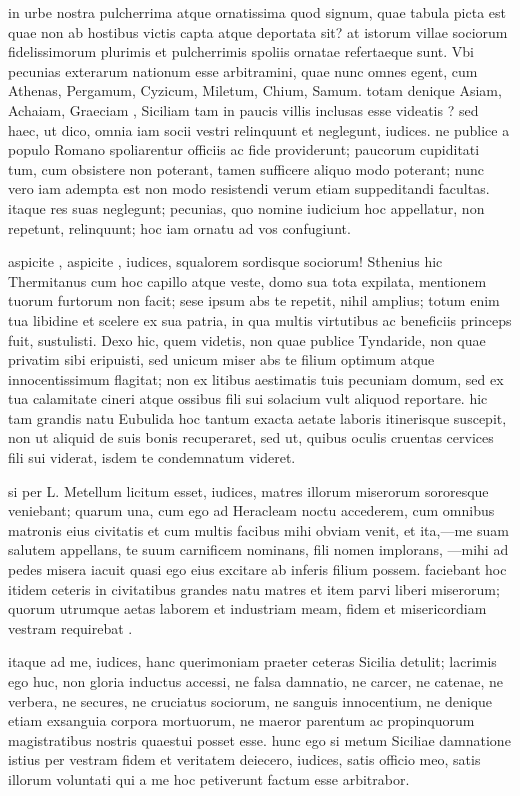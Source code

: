  in urbe nostra pulcherrima atque ornatissima quod signum, quae tabula picta est quae non ab hostibus victis capta atque deportata sit? at istorum villae sociorum fidelissimorum plurimis et pulcherrimis spoliis ornatae refertaeque sunt. Vbi pecunias exterarum nationum esse arbitramini, quae nunc omnes egent, cum Athenas, Pergamum, Cyzicum, Miletum, Chium, Samum. totam denique Asiam, Achaiam, Graeciam , Siciliam tam in paucis villis inclusas esse videatis ? sed haec, ut dico, omnia iam socii vestri relinquunt et neglegunt, iudices. ne publice a populo Romano spoliarentur officiis ac fide providerunt; paucorum cupiditati tum, cum obsistere non poterant, tamen sufficere aliquo modo poterant; nunc vero iam adempta est non modo resistendi verum etiam suppeditandi facultas. itaque res suas neglegunt; pecunias, quo nomine iudicium hoc appellatur, non repetunt, relinquunt; hoc iam ornatu ad vos confugiunt.

 aspicite , aspicite , iudices, squalorem sordisque sociorum! Sthenius hic Thermitanus cum hoc capillo atque veste, domo sua tota expilata, mentionem tuorum furtorum non facit; sese ipsum abs te repetit, nihil amplius; totum enim tua libidine et scelere ex sua patria, in qua multis virtutibus ac beneficiis princeps fuit, sustulisti. Dexo hic, quem videtis, non quae publice Tyndaride, non quae privatim sibi eripuisti, sed unicum miser abs te filium optimum atque innocentissimum flagitat; non ex litibus aestimatis tuis pecuniam domum, sed ex tua calamitate cineri atque ossibus fili sui solacium vult aliquod reportare. hic tam grandis natu Eubulida hoc tantum exacta aetate laboris itinerisque suscepit, non ut aliquid de suis bonis recuperaret, sed ut, quibus oculis cruentas cervices fili sui viderat, isdem te condemnatum videret.

 si per L. Metellum licitum esset, iudices, matres illorum miserorum sororesque veniebant; quarum una, cum ego ad Heracleam noctu accederem, cum omnibus matronis eius civitatis et cum multis facibus mihi obviam venit, et ita,—me suam salutem appellans, te suum carnificem nominans, fili nomen implorans, —mihi ad pedes misera iacuit quasi ego eius excitare ab inferis filium possem. faciebant hoc itidem ceteris in civitatibus grandes natu matres et item parvi liberi miserorum; quorum utrumque aetas laborem et industriam meam, fidem et misericordiam vestram requirebat .

 itaque ad me, iudices, hanc querimoniam praeter ceteras Sicilia detulit; lacrimis ego huc, non gloria inductus accessi, ne falsa damnatio, ne carcer, ne catenae, ne verbera, ne secures, ne cruciatus sociorum, ne sanguis innocentium, ne denique etiam exsanguia corpora mortuorum, ne maeror parentum ac propinquorum magistratibus nostris quaestui posset esse. hunc ego si metum Siciliae damnatione istius per vestram fidem et veritatem deiecero, iudices, satis officio meo, satis illorum voluntati qui a me hoc petiverunt factum esse arbitrabor.

